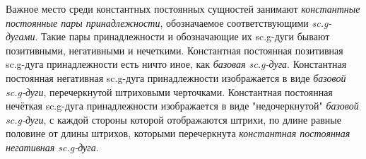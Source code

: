 \begin{SCn}
{Важное место среди константных постоянных сущностей занимают \textit{константные постоянные пары принадлежности}, обозначаемое соответствующими \textit{sc.g-дугами}. Такие пары принадлежности и обозначающие их sc.g-дуги бывают позитивными, негативными и нечеткими. Константная постоянная позитивная sc.g-дуга принадлежности есть ничто иное, как \textit{базовая sc.g-дуга}. Константная постоянная негативная sc.g-дуга принадлежности изображается в виде \textit{базовой sc.g-дуги}, перечеркнутой штриховыми черточками. Константная постоянная нечёткая sc.g-дуга принадлежности изображается в виде "недочеркнутой"{} \textit{базовой sc.g-дуги}, с каждой стороны которой отображаются штрихи, по длине равные половине от длины штрихов, которыми перечеркнута \textit{константная постоянная негативная sc.g-дуга}.}


\scnstructinclusion


\end{SCn}
